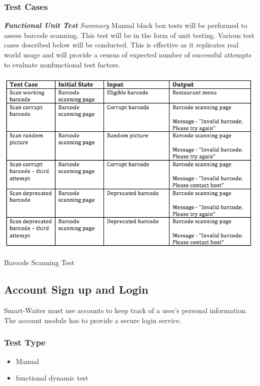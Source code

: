 \documentclass[12pt]{article}
\begin{document}
\subsubsection{Test Cases}
\textbf{\textit{Functional Unit Test}}\newline
\newline
\textit{Summary}\newline
Manual black box tests will be performed to assess barcode scanning. This test will be in the form of unit testing. Various test cases described below will be conducted. This is effective as it replicates real world usage and will provide a census of expected number of successful attempts to evaluate nonfunctional test factors.
\newline
\begin{table}[h]
\includegraphics[width=\textwidth,height=\textheight,keepaspectratio]{barcode.png}\newline
  \caption{Barcode Scanning Test}
\end{table}

\subsection{Account Sign up and Login}
Smart-Waiter must use accounts to keep track of a user's personal information. The account module has to provide a secure login service. 
\subsubsection{Test Type}
\begin{itemize}
  \item Manual
  \item functional dynamic test
\end{itemize}
\end{document}

